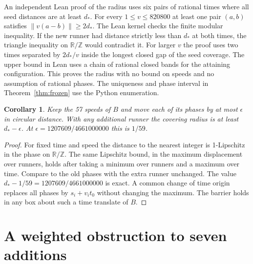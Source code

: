 \documentclass[11pt]{article}
\newtheorem{corollary}[theorem]{Corollary}
\newcommand{\T}{\mathbb{R}/\mathbb{Z}}
\newcommand{\norm}[1]{\left\lVert #1\right\rVert}
\begin{document}
An independent Lean proof of the radius uses six pairs of rational
times where all seed distances are at least \(d_*\).
For every \(1\le v\le820800\) at least one pair \((a,b)\) satisfies
\(\norm{v(a-b)}\ge2d_*\). The Lean kernel checks the finite modular
inequality. If the new runner had distance strictly less than \(d_*\)
at both times, the triangle inequality on \(\T\) would contradict
it. For larger \(v\) the proof uses two times separated by
\(2d_*/v\) inside the longest closed gap of the seed coverage.
The upper bound in Lean uses a chain of rational closed bands for
the attaining configuration. This proves the radius with no bound
on speeds and no assumption of rational phases. The uniqueness
and phase interval in Theorem~\ref{thm:frozen} use the Python
enumeration.

\begin{corollary}\label{cor:stability}
Keep the 57 speeds of \(B\) and move each of its phases by at most
\(\epsilon\) in circular distance. With any additional runner the
covering radius is at least \(d_*-\epsilon\). At
\(\epsilon=1207609/4661000000\) this is \(1/59\).
\end{corollary}
\begin{proof}
For fixed time and speed the distance to the nearest integer is
1-Lipschitz in the phase on \(\T\). The same Lipschitz bound, in the
maximum displacement over runners, holds after taking a minimum
over runners and a maximum over time. Compare to the old phases
with the extra runner unchanged. The value
\(d_*-1/59=1207609/4661000000\) is exact.
A common change of time origin replaces all phases by \(s_i+v_i t_0\)
without changing the maximum. The barrier holds in any box about
such a time translate of \(B\).
\end{proof}

\section{A weighted obstruction to seven additions}
\end{document}

